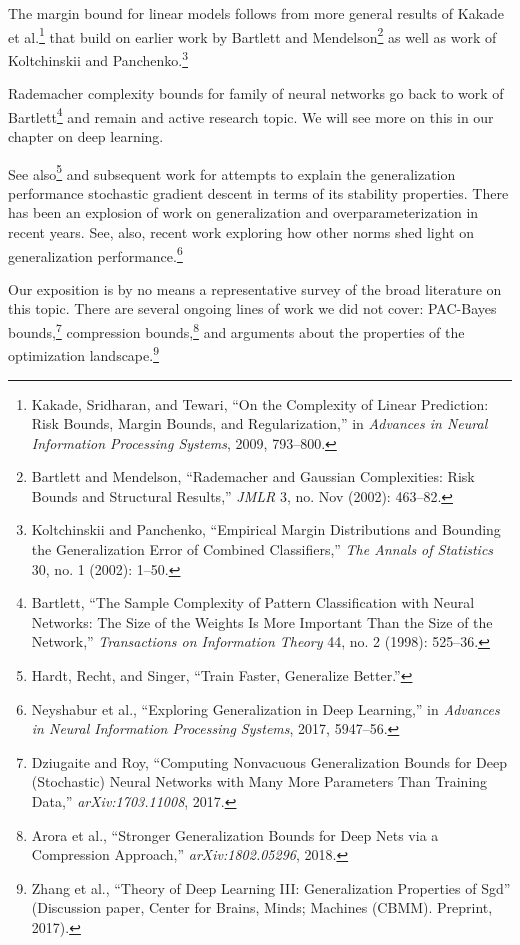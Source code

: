 \documentclass{tufte-book}
\begin{document}
The margin bound for linear models follows from more general results of
Kakade et al.\footnote{Kakade, Sridharan, and Tewari, {``On the
  Complexity of Linear Prediction: Risk Bounds, Margin Bounds, and
  Regularization,''} in \emph{Advances in Neural Information Processing
  Systems}, 2009, 793--800.} that build on earlier work by Bartlett and
Mendelson\footnote{Bartlett and Mendelson, {``Rademacher and Gaussian
  Complexities: Risk Bounds and Structural Results,''} \emph{JMLR} 3,
  no. Nov (2002): 463--82.} as well as work of Koltchinskii and
Panchenko.\footnote{Koltchinskii and Panchenko, {``Empirical Margin
  Distributions and Bounding the Generalization Error of Combined
  Classifiers,''} \emph{The Annals of Statistics} 30, no. 1 (2002):
  1--50.}

Rademacher complexity bounds for family of neural networks go back to
work of Bartlett\footnote{Bartlett, {``The Sample Complexity of Pattern
  Classification with Neural Networks: The Size of the Weights Is More
  Important Than the Size of the Network,''} \emph{Transactions on
  Information Theory} 44, no. 2 (1998): 525--36.} and remain and active
research topic. We will see more on this in our chapter on deep
learning.

See also\footnote{Hardt, Recht, and Singer, {``Train Faster, Generalize
  Better.''}} and subsequent work for attempts to explain the
generalization performance stochastic gradient descent in terms of its
stability properties. There has been an explosion of work on
generalization and overparameterization in recent years. See, also,
recent work exploring how other norms shed light on generalization
performance.\footnote{Neyshabur et al., {``Exploring Generalization in
  Deep Learning,''} in \emph{Advances in Neural Information Processing
  Systems}, 2017, 5947--56.}

Our exposition is by no means a representative survey of the broad
literature on this topic. There are several ongoing lines of work we did
not cover: PAC-Bayes bounds,\footnote{Dziugaite and Roy, {``Computing
  Nonvacuous Generalization Bounds for Deep (Stochastic) Neural Networks
  with Many More Parameters Than Training Data,''}
  \emph{arXiv:1703.11008}, 2017.} compression bounds,\footnote{Arora et
  al., {``Stronger Generalization Bounds for Deep Nets via a Compression
  Approach,''} \emph{arXiv:1802.05296}, 2018.} and arguments about the
properties of the optimization landscape.\footnote{Zhang et al.,
  {``Theory of Deep Learning {III}: Generalization Properties of Sgd''}
  (Discussion paper, Center for Brains, Minds; Machines (CBMM).
  Preprint, 2017).}
\end{document}
